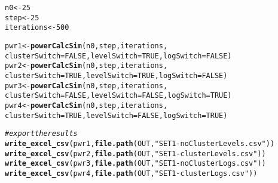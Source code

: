 \documentclass[10pt]{article}\usepackage[]{graphicx}\usepackage[]{color}
\makeatletter
\newcommand{\hlnum}[1]{\textcolor[rgb]{0.686,0.059,0.569}{#1}}%
\newcommand{\hlstr}[1]{\textcolor[rgb]{0.192,0.494,0.8}{#1}}%
\newcommand{\hlcom}[1]{\textcolor[rgb]{0.678,0.584,0.686}{\textit{#1}}}%
\newcommand{\hlstd}[1]{\textcolor[rgb]{0.345,0.345,0.345}{#1}}%
\newcommand{\hlkwb}[1]{\textcolor[rgb]{0.69,0.353,0.396}{#1}}%
\newcommand{\hlkwc}[1]{\textcolor[rgb]{0.333,0.667,0.333}{#1}}%
\newcommand{\hlkwd}[1]{\textcolor[rgb]{0.737,0.353,0.396}{\textbf{#1}}}%
\newenvironment{kframe}{%
 \def\at@end@of@kframe{}%
 \ifinner\ifhmode%
  \def\at@end@of@kframe{\end{minipage}}%
  \begin{minipage}{\columnwidth}%
 \fi\fi%
 \def\FrameCommand##1{\hskip\@totalleftmargin \hskip-\fboxsep
 \colorbox{shadecolor}{##1}\hskip-\fboxsep
     \hskip-\linewidth \hskip-\@totalleftmargin \hskip\columnwidth}%
 \MakeFramed {\advance\hsize-\width
   \@totalleftmargin\z@ \linewidth\hsize
   \@setminipage}}%
 {\par\unskip\endMakeFramed%
 \at@end@of@kframe}
\newenvironment{knitrout}{}{} %
\makeatother
\begin{document}
\begin{knitrout}
\color{fgcolor}\begin{kframe}
\begin{alltt}
\hlstd{n0} \hlkwb{<-} \hlnum{25}
\hlstd{step} \hlkwb{<-} \hlnum{25}
\hlstd{iterations} \hlkwb{<-} \hlnum{500}

\hlstd{pwr1} \hlkwb{<-} \hlkwd{powerCalcSim}\hlstd{(n0,step,iterations,}
                       \hlkwc{clusterSwitch} \hlstd{=} \hlnum{FALSE}\hlstd{,} \hlkwc{levelSwitch} \hlstd{=} \hlnum{TRUE}\hlstd{,}  \hlkwc{logSwitch} \hlstd{=} \hlnum{FALSE}\hlstd{)}
\hlstd{pwr2} \hlkwb{<-} \hlkwd{powerCalcSim}\hlstd{(n0,step,iterations,}
                       \hlkwc{clusterSwitch} \hlstd{=} \hlnum{TRUE}\hlstd{,}  \hlkwc{levelSwitch} \hlstd{=} \hlnum{TRUE}\hlstd{,}  \hlkwc{logSwitch} \hlstd{=} \hlnum{FALSE}\hlstd{)}
\hlstd{pwr3} \hlkwb{<-} \hlkwd{powerCalcSim}\hlstd{(n0,step,iterations,}
                       \hlkwc{clusterSwitch} \hlstd{=} \hlnum{FALSE}\hlstd{,} \hlkwc{levelSwitch} \hlstd{=} \hlnum{FALSE}\hlstd{,} \hlkwc{logSwitch} \hlstd{=} \hlnum{TRUE}\hlstd{)}
\hlstd{pwr4} \hlkwb{<-} \hlkwd{powerCalcSim}\hlstd{(n0,step,iterations,}
                       \hlkwc{clusterSwitch} \hlstd{=} \hlnum{TRUE}\hlstd{,}  \hlkwc{levelSwitch} \hlstd{=} \hlnum{FALSE}\hlstd{,} \hlkwc{logSwitch} \hlstd{=} \hlnum{TRUE}\hlstd{)}
\end{alltt}
\end{kframe}
\end{knitrout}

\begin{knitrout}
\color{fgcolor}\begin{kframe}
\begin{alltt}
\hlcom{# export the results}
\hlkwd{write_excel_csv}\hlstd{(pwr1,} \hlkwd{file.path}\hlstd{(OUT,}\hlstr{"SET1-noClusterLevels.csv"}\hlstd{))}
\hlkwd{write_excel_csv}\hlstd{(pwr2,} \hlkwd{file.path}\hlstd{(OUT,}\hlstr{"SET1-clusterLevels.csv"}\hlstd{))}
\hlkwd{write_excel_csv}\hlstd{(pwr3,} \hlkwd{file.path}\hlstd{(OUT,}\hlstr{"SET1-noClusterLogs.csv"}\hlstd{))}
\hlkwd{write_excel_csv}\hlstd{(pwr4,} \hlkwd{file.path}\hlstd{(OUT,}\hlstr{"SET1-clusterLogs.csv"}\hlstd{))}
\end{alltt}
\end{kframe}
\end{knitrout}
\end{document}
